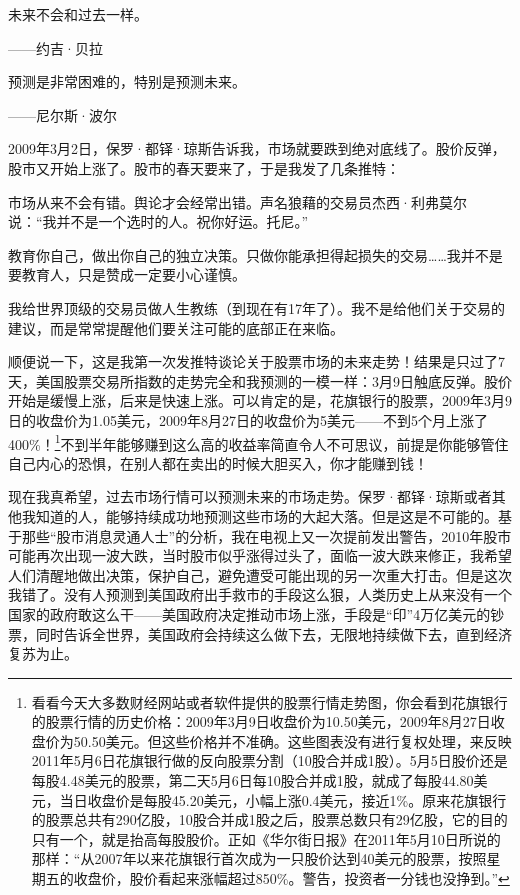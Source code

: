 \begin{BookQuote}
未来不会和过去一样。

\hfill ——约吉·贝拉
\end{BookQuote}

\begin{BookQuote}
预测是非常困难的，特别是预测未来。

\hfill ——尼尔斯·波尔
\end{BookQuote}

2009年3月2日，保罗·都铎·琼斯告诉我，市场就要跌到绝对底线了。股价反弹，股市又开始上涨了。股市的春天要来了，于是我发了几条推特：

市场从来不会有错。舆论才会经常出错。声名狼藉的交易员杰西·利弗莫尔说：“我并不是一个选时的人。祝你好运。托尼。”

教育你自己，做出你自己的独立决策。只做你能承担得起损失的交易……我并不是要教育人，只是赞成一定要小心谨慎。

我给世界顶级的交易员做人生教练（到现在有17年了）。我不是给他们关于交易的建议，而是常常提醒他们要关注可能的底部正在来临。

顺便说一下，这是我第一次发推特谈论关于股票市场的未来走势！结果是只过了7天，美国股票交易所指数的走势完全和我预测的一模一样：3月9日触底反弹。股价开始是缓慢上涨，后来是快速上涨。可以肯定的是，花旗银行的股票，2009年3月9日的收盘价为1.05美元，2009年8月27日的收盘价为5美元——不到5个月上涨了400\%！\footnote{\label{fn:pdf-25-1}看看今天大多数财经网站或者软件提供的股票行情走势图，你会看到花旗银行的股票行情的历史价格：2009年3月9日收盘价为10.50美元，2009年8月27日收盘价为50.50美元。但这些价格并不准确。这些图表没有进行复权处理，来反映2011年5月6日花旗银行做的反向股票分割（10股合并成1股）。5月5日股价还是每股4.48美元的股票，第二天5月6日每10股合并成1股，就成了每股44.80美元，当日收盘价是每股45.20美元，小幅上涨0.4美元，接近1\%。原来花旗银行的股票总共有290亿股，10股合并成1股之后，股票总数只有29亿股，它的目的只有一个，就是抬高每股股价。正如《华尔街日报》在2011年5月10日所说的那样：“从2007年以来花旗银行首次成为一只股价达到40美元的股票，按照星期五的收盘价，股价看起来涨幅超过850\%。警告，投资者一分钱也没挣到。”}不到半年能够赚到这么高的收益率简直令人不可思议，前提是你能够管住自己内心的恐惧，在别人都在卖出的时候大胆买入，你才能赚到钱！

现在我真希望，过去市场行情可以预测未来的市场走势。保罗·都铎·琼斯或者其他我知道的人，能够持续成功地预测这些市场的大起大落。但是这是不可能的。基于那些“股市消息灵通人士”的分析，我在电视上又一次提前发出警告，2010年股市可能再次出现一波大跌，当时股市似乎涨得过头了，面临一波大跌来修正，我希望人们清醒地做出决策，保护自己，避免遭受可能出现的另一次重大打击。但是这次我错了。没有人预测到美国政府出手救市的手段这么狠，人类历史上从来没有一个国家的政府敢这么干——美国政府决定推动市场上涨，手段是“印”4万亿美元的钞票，同时告诉全世界，美国政府会持续这么做下去，无限地持续做下去，直到经济复苏为止。


